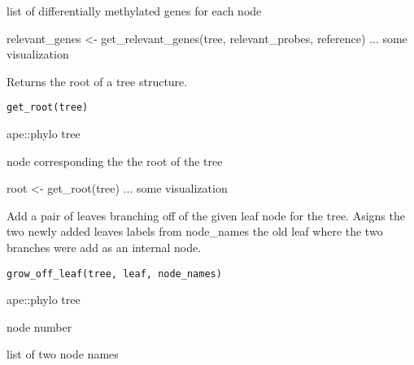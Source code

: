 \documentclass[a4paper]{book}
\begin{document}
%
\begin{Value}
list of differentially methylated genes for each node
\end{Value}
%
\begin{Examples}
\begin{ExampleCode}
relevant_genes <- get_relevant_genes(tree, relevant_probes, reference)
... some visualization 
\end{ExampleCode}
\end{Examples}
%
\begin{Description}\relax
Returns the root of a tree structure.
\end{Description}
%
\begin{Usage}
\begin{verbatim}
get_root(tree)
\end{verbatim}
\end{Usage}
%
\begin{Arguments}
\begin{ldescription}
\item[\code{tree}] ape::phylo tree
\end{ldescription}
\end{Arguments}
%
\begin{Value}
node corresponding the the root of the tree
\end{Value}
%
\begin{Examples}
\begin{ExampleCode}
root <- get_root(tree)
... some visualization 
\end{ExampleCode}
\end{Examples}
%
\begin{Description}\relax
Add a pair of leaves branching off of the given leaf node for the tree. 
Asigns the two newly added leaves labels from node\_names the old leaf where 
the two branches were add as an internal node.
\end{Description}
%
\begin{Usage}
\begin{verbatim}
grow_off_leaf(tree, leaf, node_names)
\end{verbatim}
\end{Usage}
%
\begin{Arguments}
\begin{ldescription}
\item[\code{tree}] ape::phylo tree

\item[\code{leaf}] node number

\item[\code{node\_names}] list of two node names
\end{ldescription}
\end{Arguments}
\end{document}
